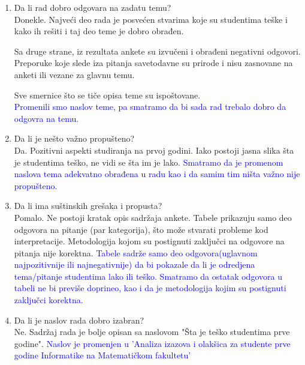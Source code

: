 \documentclass[a4paper]{report}
\newcommand{\odgovor}[1]{\textcolor{blue}{#1}}
\begin{document}
\begin{enumerate}
\item Da li rad dobro odgovara na zadatu temu?\\
Donekle. Najveći deo rada je posvećen stvarima koje su studentima teške i kako ih rešiti i taj deo teme je dobro obrađen. \hfill \break

Sa druge strane, iz rezultata ankete su izvučeni i obrađeni negativni odgovori. Preporuke koje slede iza pitanja savetodavne su prirode i nisu zasnovane na anketi ili vezane za glavnu temu.
\hfill \break

Sve smernice što se tiče opisa teme su ispoštovane. \\
\odgovor{Promenili smo naslov teme, pa smatramo da bi sada rad trebalo dobro da odgovra na temu.}
\item Da li je nešto važno propušteno?\\
Da. Pozitivni aspekti studiranja na prvoj godini. Iako postoji jasna slika šta je studentima teško, ne vidi se šta im je lako. \odgovor{Smatramo da je promenom naslova tema adekvatno obrađena u radu kao i da samim tim ništa važno nije propušteno.}

\item Da li ima suštinskih grešaka i propusta?\\
Pomalo. Ne postoji kratak opis sadržaja ankete. Tabele prikazuju samo deo odgovora na pitanje (par kategorija), što može stvarati probleme kod interpretacije. Metodologija kojom su postignuti zaključci na odgovore na pitanja nije korektna. \odgovor{Tabele sadrže samo deo odgovora(uglavnom najpozitivnije ili najnegativnije) da bi pokazale da li je odredjena tema/pitanje studentima lako ili teško. Smatramo da ostatak odgovora u tabeli ne bi previše doprineo, kao i da je metodologija kojim su postignuti zaključci korektna.}

\item Da li je naslov rada dobro izabran?\\
Ne. Sadržaj rada je bolje opisan sa naslovom "Šta je teško studentima prve godine". \odgovor{Naslov je promenjen u 'Analiza izazova i olakšica za studente prve godine Informatike na  Matematičkom fakultetu'}


\end{enumerate}
\end{document}
